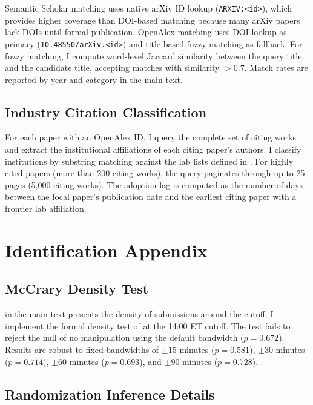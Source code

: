\documentclass[12pt]{article}
\begin{document}
Semantic Scholar matching uses native arXiv ID lookup (\texttt{ARXIV:<id>}), which provides higher coverage than DOI-based matching because many arXiv papers lack DOIs until formal publication. OpenAlex matching uses DOI lookup as primary (\texttt{10.48550/arXiv.<id>}) and title-based fuzzy matching as fallback. For fuzzy matching, I compute word-level Jaccard similarity between the query title and the candidate title, accepting matches with similarity $> 0.7$. Match rates are reported by year and category in the main text.

\subsection{Industry Citation Classification}

For each paper with an OpenAlex ID, I query the complete set of citing works and extract the institutional affiliations of each citing paper's authors. I classify institutions by substring matching against the lab lists defined in . For highly cited papers (more than 200 citing works), the query paginates through up to 25 pages (5,000 citing works). The adoption lag is computed as the number of days between the focal paper's publication date and the earliest citing paper with a frontier lab affiliation.


\section{Identification Appendix}

\subsection{McCrary Density Test}

 in the main text presents the density of submissions around the cutoff. I implement the formal density test of \citet{cattaneo2020inference} at the 14:00 ET cutoff. The test fails to reject the null of no manipulation using the default bandwidth ($p = 0.672$). Results are robust to fixed bandwidths of $\pm$15 minutes ($p = 0.581$), $\pm$30 minutes ($p = 0.714$), $\pm$60 minutes ($p = 0.693$), and $\pm$90 minutes ($p = 0.728$).

\subsection{Randomization Inference Details}
\end{document}
